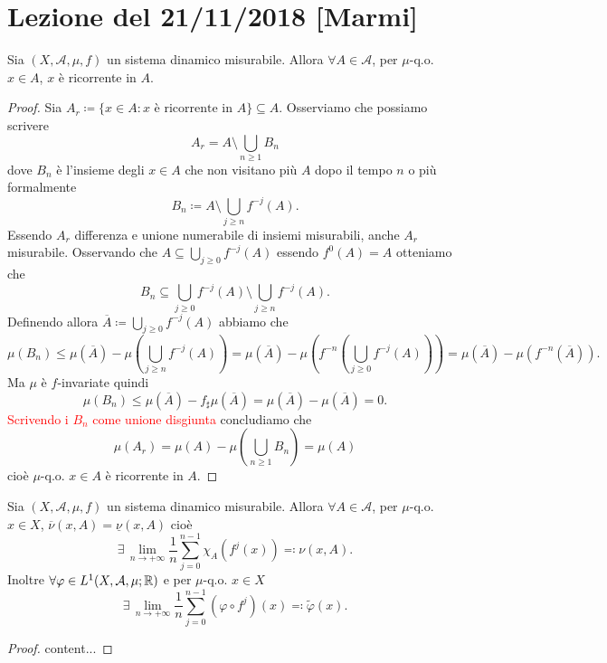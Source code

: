 \section{Lezione del 21/11/2018 [Marmi]}

\begin{thm}
    Sia $ (X, \mathcal{A}, \mu, f) $ un sistema dinamico misurabile. Allora $ \forall A \in \mathcal{A} $, per $ \mu $-q.o. $ x \in A $, $ x $ è ricorrente in $ A $. 
\end{thm}
\begin{proof}
    Sia $ A_r \coloneqq \{x \in A : x \text{ è ricorrente in } A\} \subseteq A $. Osserviamo che possiamo scrivere
    \[
        A_r = A \setminus \bigcup_{n \geq 1} B_n
    \]
    dove $ B_n $ è l'insieme degli $ x \in A $ che non visitano più $ A $ dopo il tempo $ n $ o più formalmente  
    \[
        B_n \coloneqq A \setminus \bigcup_{j \geq n} f^{-j}(A).
    \]
    Essendo $ A_r $ differenza e unione numerabile di insiemi misurabili, anche $ A_r $ misurabile. Osservando che $ A \subseteq \bigcup_{j \geq 0} f^{-j}(A) $ essendo $ f^{0}(A) = A $ otteniamo che 
    \[
        B_n \subseteq \bigcup_{j \geq 0} f^{-j}(A) \setminus  \bigcup_{j \geq n} f^{-j}(A).
    \]
    Definendo allora $ \overline{A} \coloneqq \bigcup_{j \geq 0} f^{-j}(A) $ abbiamo che 
    \[
        \mu(B_n) \leq \mu(\overline{A}) - \mu\left(\textstyle{\bigcup_{j \geq n}} f^{-j}(A)\right) = \mu(\overline{A}) - \mu\left(f^{-n}\left(\textstyle{\bigcup_{j \geq 0}} f^{-j}(A)\right)\right) = \mu(\overline{A}) - \mu(f^{-n}(\overline{A})).
    \]
    Ma $ \mu $ è $ f $-invariate quindi
    \[
        \mu(B_n) \leq \mu(\overline{A}) - f_{\sharp}\mu(\overline{A}) = \mu(\overline{A}) - \mu(\overline{A}) = 0.
    \]
    \textcolor{red}{Scrivendo i $ B_n $ come unione disgiunta} concludiamo che 
    \[
        \mu(A_r) = \mu(A) - \mu\left(\textstyle{\bigcup_{n \geq 1}} B_n\right) = \mu(A)
    \]
    cioè $ \mu $-q.o. $ x \in A $ è ricorrente in $ A $.
\end{proof}

\begin{thm}[Birkoff] \label{thm:Birkoff}
    Sia $ (X, \mathcal{A}, \mu, f) $ un sistema dinamico misurabile. Allora $ \forall A \in \mathcal{A} $, per $ \mu $-q.o. $ x \in X $, $ \overline{\nu}(x, A) = \underline{\nu}(x, A) $ cioè
    \[
        \exists \, \lim_{n \to +\infty} \frac{1}{n} \sum_{j = 0}^{n-1} \chi_A(f^{j}(x)) \eqqcolon \nu(x, A).
    \]
    Inoltre $ \forall \varphi \in L^1(X, \mathcal{A}, \mu; \mathbb{R}) $ e per $ \mu $-q.o. $ x \in X $
    \[
        \exists \, \lim_{n \to +\infty} \frac{1}{n} \sum_{j=0}^{n-1} (\varphi \circ f^j)(x) \eqqcolon \tilde{\varphi}(x).
    \]
\end{thm}
\begin{proof}
    content...
\end{proof}

